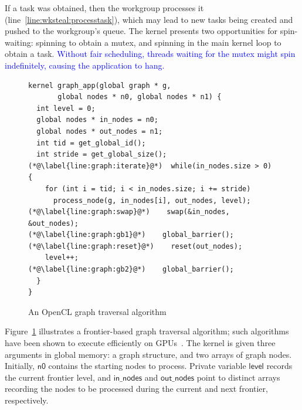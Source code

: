 \documentclass[sigconf]{acmart}
\newcommand{\TSAdded}[1]{\textcolor{blue}{#1}}
\newcommand{\myfiglong}{Figure~}
\newcommand{\keyword}[1]{\mathsf{#1}}
\begin{document}
If a task was obtained, then the workgroup processes it
(line~\ref{line:wksteal:processtask}), which may lead to new tasks
being created and pushed to the workgroup's queue. The kernel presents
two opportunities for spin-waiting: spinning to obtain a mutex, and
spinning in the main kernel loop to obtain a task. \TSAdded{Without fair
scheduling, threads waiting for the mutex might spin indefinitely,
causing the application to hang.}


%
%




\begin{figure}[t]

\begin{lstlisting}
kernel graph_app(global graph * g,
       global nodes * n0, global nodes * n1) {
  int level = 0;
  global nodes * in_nodes = n0;
  global nodes * out_nodes = n1;
  int tid = get_global_id();
  int stride = get_global_size();
(*@\label{line:graph:iterate}@*)  while(in_nodes.size > 0) {
    for (int i = tid; i < in_nodes.size; i += stride)
      process_node(g, in_nodes[i], out_nodes, level);
(*@\label{line:graph:swap}@*)    swap(&in_nodes, &out_nodes);
(*@\label{line:graph:gb1}@*)    global_barrier();
(*@\label{line:graph:reset}@*)    reset(out_nodes);
    level++;
(*@\label{line:graph:gb2}@*)    global_barrier();
  }
}
\end{lstlisting}
\caption{An OpenCL graph traversal algorithm}\label{fig:graphsearch}
\end{figure}

 \myfiglong\ref{fig:graphsearch} illustrates a frontier-based graph traversal algorithm; such algorithms have
been shown to execute efficiently on GPUs~\cite{BNP12,DBLP:conf/oopsla/PaiP16}.
The kernel is
given three arguments in global memory: a graph structure, and two
arrays of graph nodes. Initially, $\keyword{n0}$ contains the
starting nodes to process. Private variable $\keyword{level}$ records the current frontier level, and $\keyword{in\_nodes}$ and $\keyword{out\_nodes}$ point to
distinct arrays recording the nodes to be processed during the current and next frontier, respectively.
\end{document}
